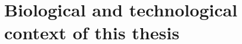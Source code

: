 \chapter{Biological and technological context of this thesis}
\label{ch:background}

\begin{comment}
\setlength{\epigraphwidth}{0.6\textwidth}
\epigraphhead[70]{%
    \epigraph{It would probably be oversimplifying the
    matter,\\but I am strongly tempted to say,\\ \textquote{All life is nucleic acid; the rest is
    commentary}.}{\cite{asimov:WrongRel}}%
}
\end{comment}

\begin{comment}
When Asimov concluded with these words his chapter \textquote{Beginning with bone},
scientists had already started unfolding one of the most mesmerising biological
mystery: how does the Nature manage and organise the production of specific
effectors in specific locations. In other words how from one cell
\TK{revoir cette phrase: idea initiale pourquoi
organisme A different
de B, ou un foie et un foie et pas un coeur + comment d'une cellule-oeuf on a un
organisme complet qui se creée\ldots ne pas s'étendre dessus par contre}.\
Watson and Crick by publishing the double-helix structure of \DNA\
\mycite{DNA1953} unlocked our path to understand the natural ways of storing and
manipulating the information. As the whole past six decades were packed with major
discoveries and technological achievements, there are many, fascinating,
milestones that could be discussed.
The following pages present a summary of the facts and techniques
that form the biological and technical context of the work backing this thesis.

--- ici intro par rapport à Asimov et le fait que l'ADN est un \enquote{blueprint}
    et qu'en fonction du l'organe ou du develepment stage l'expression est régulé.
    On sait maitenant que la régulation se passe à différent niveau\ldots Finir
    peut être la section sur Harvey qui a élucider la circulation sanguine car
    il a utilisé l'observation et quantification du sang ---


As where the situation stands for now, we know that between the unique common
bluprint, which is the \DNA\ and the different phenotypes displayed by the tissues
comprising our bodies, they are many regulatory processes occurring at different
layers (transcription, and translation).



\end{comment}
